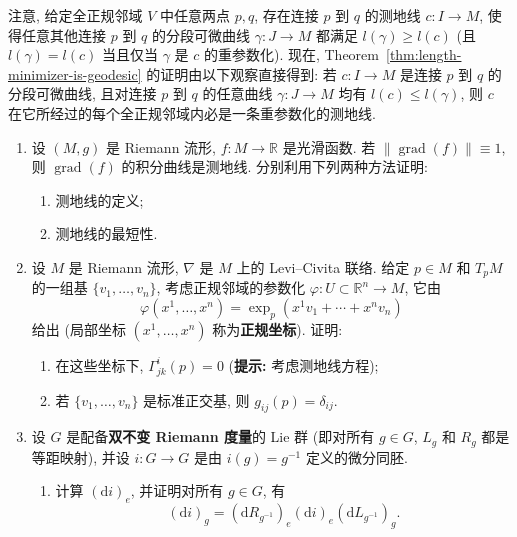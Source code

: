 \begin{RiemannProof}
注意, 给定全正规邻域 $V$ 中任意两点 $p,q$, 存在连接 $p$ 到 $q$ 的测地线 $c:I\to M$, 使得任意其他连接 $p$ 到 $q$ 的分段可微曲线 $\gamma:J\to M$ 都满足 $l(\gamma)\geq l(c)$ (且 $l(\gamma)=l(c)$ 当且仅当 $\gamma$ 是 $c$ 的重参数化). 现在, Theorem~\ref{thm:length-minimizer-is-geodesic} 的证明由以下观察直接得到: 若 $c:I\to M$ 是连接 $p$ 到 $q$ 的分段可微曲线, 且对连接 $p$ 到 $q$ 的任意曲线 $\gamma:J\to M$ 均有 $l(c)\leq l(\gamma)$, 则 $c$ 在它所经过的每个全正规邻域内必是一条重参数化的测地线.
\end{RiemannProof}

\begin{RiemannExercise}\label{ex:minimizing-properties-of-geodesics}
\begin{enumerate}[label=(\arabic*),ref=\arabic*,leftmargin=*]
\item\label{ex:unit-gradient-integral-curves} 设 $(M,g)$ 是 Riemann 流形, $f:M\to\mathbb{R}$ 是光滑函数. 若 $\lVert\operatorname{grad}(f)\rVert\equiv1$, 则 $\operatorname{grad}(f)$ 的积分曲线是测地线. 分别利用下列两种方法证明:
\begin{enumerate}[label=(\alph*),leftmargin=*]
\item 测地线的定义;
\item 测地线的最短性.
\end{enumerate}
\item\label{ex:metric-and-connection-in-normal-coordinates} 设 $M$ 是 Riemann 流形, $\nabla$ 是 $M$ 上的 Levi–Civita 联络. 给定 $p\in M$ 和 $T_pM$ 的一组基 $\{v_1,\ldots,v_n\}$, 考虑正规邻域的参数化 $\varphi:U\subset\mathbb{R}^n\to M$, 它由
\[
  \varphi(x^1,\ldots,x^n)=\exp_p(x^1v_1+\cdots+x^nv_n)
\]
给出 (局部坐标 $(x^1,\ldots,x^n)$ 称为\textbf{正规坐标}). 证明:
\begin{enumerate}[label=(\alph*),leftmargin=*]
\item 在这些坐标下, $\Gamma_{jk}^i(p)=0$ {\small (\textbf{提示:} 考虑测地线方程)};
\item 若 $\{v_1,\ldots,v_n\}$ 是标准正交基, 则 $g_{ij}(p)=\delta_{ij}$.
\end{enumerate}
\item\label{ex:bi-invariant-metrics-on-lie-groups} 设 $G$ 是配备\textbf{双不变 Riemann 度量}的 Lie 群 (即对所有 $g\in G$, $L_g$ 和 $R_g$ 都是等距映射), 并设 $i:G\to G$ 是由 $i(g)=g^{-1}$ 定义的微分同胚.
\begin{enumerate}[label=(\alph*),leftmargin=*]
\item 计算 $(\mathrm{d}i)_e$, 并证明对所有 $g\in G$, 有
\[
  (\mathrm{d}i)_g=(\mathrm{d}R_{g^{-1}})_e(\mathrm{d}i)_e(\mathrm{d}L_{g^{-1}})_g.
\]
\end{enumerate}
\end{enumerate}
\end{RiemannExercise}
